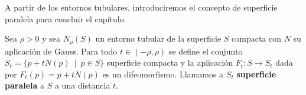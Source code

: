 A partir de los entornos tubulares, introduciremos el concepto de superficie paralela para concluir el capítulo.

\begin{definition}
Sea $\rho > 0$ y sea $N_\rho(S)$ un entorno tubular de la superficie $S$ compacta con $N$ su aplicación de Gauss. Para todo $t \in (-\rho, \rho)$ se define el conjunto $S_t=\{p + tN(p) \enspace | \enspace p \in S\}$ superficie compacta y la aplicación $F_t: S \longrightarrow S_t$ dada por $F_t(p)=p+tN(p)$ es un difeomorfismo.
Llamamos a $S_t$ \textbf{superficie paralela} a $S$ a una distancia $t$.
\end{definition}